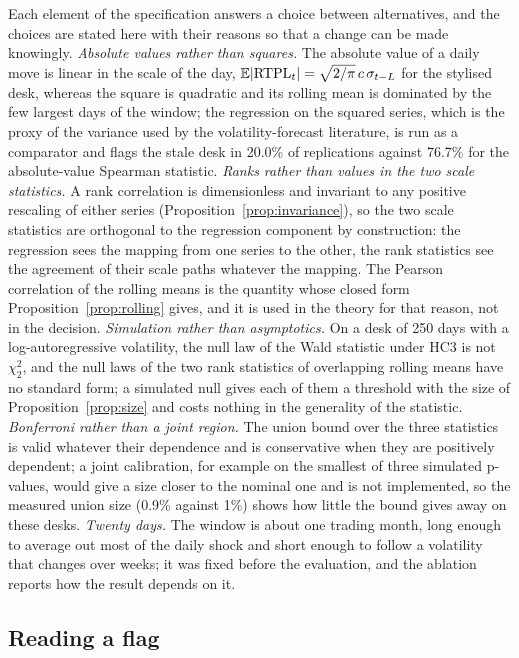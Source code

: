 Each element of the specification answers a choice between alternatives, and the choices are stated here with their reasons so that a change can be made knowingly.
\emph{Absolute values rather than squares.}
The absolute value of a daily move is linear in the scale of the day, $\mathbb{E}|\mathrm{RTPL}_t|=\sqrt{2/\pi}\,c\,\sigma_{t-L}$ for the stylised desk, whereas the square is quadratic and its rolling mean is dominated by the few largest days of the window; the regression on the squared series, which is the proxy of the variance used by the volatility-forecast literature, is run as a comparator and flags the stale desk in 20.0\% of replications against 76.7\% for the absolute-value Spearman statistic.
\emph{Ranks rather than values in the two scale statistics.}
A rank correlation is dimensionless and invariant to any positive rescaling of either series (Proposition~\ref{prop:invariance}), so the two scale statistics are orthogonal to the regression component by construction: the regression sees the mapping from one series to the other, the rank statistics see the agreement of their scale paths whatever the mapping.
The Pearson correlation of the rolling means is the quantity whose closed form Proposition~\ref{prop:rolling} gives, and it is used in the theory for that reason, not in the decision.
\emph{Simulation rather than asymptotics.}
On a desk of 250 days with a log-autoregressive volatility, the null law of the Wald statistic under HC3 is not $\chi^2_2$, and the null laws of the two rank statistics of overlapping rolling means have no standard form; a simulated null gives each of them a threshold with the size of Proposition~\ref{prop:size} and costs nothing in the generality of the statistic.
\emph{Bonferroni rather than a joint region.}
The union bound over the three statistics is valid whatever their dependence and is conservative when they are positively dependent; a joint calibration, for example on the smallest of three simulated p-values, would give a size closer to the nominal one and is not implemented, so the measured union size (0.9\% against 1\%) shows how little the bound gives away on these desks.
\emph{Twenty days.}
The window is about one trading month, long enough to average out most of the daily shock and short enough to follow a volatility that changes over weeks; it was fixed before the evaluation, and the ablation reports how the result depends on it.

\subsection{Reading a flag}
\label{sec:method-reading}

